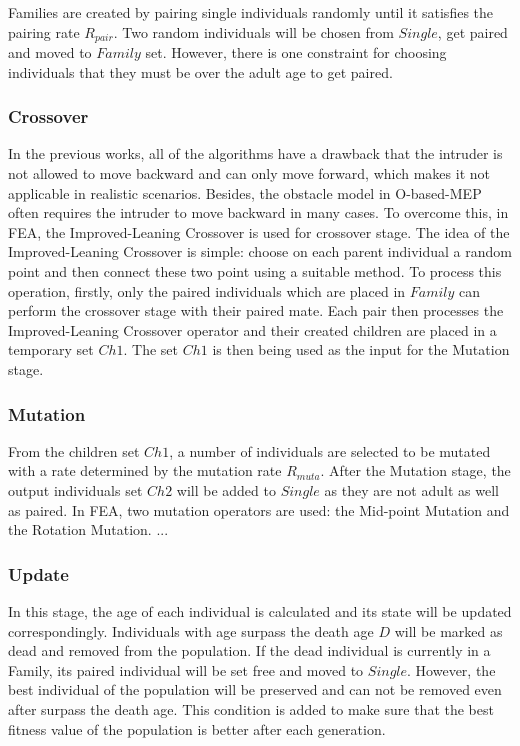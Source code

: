 \documentclass[final]{elsarticle}
\begin{document}
Families are created by pairing single individuals randomly until it satisfies the pairing rate $R_{pair}$. Two random individuals will be chosen from $Single$, get paired and moved to $Family$ set. However, there is one constraint for choosing individuals that they must be over the adult age to get paired.

\subsubsection{Crossover}

In the previous works, all of the algorithms have a drawback that the intruder is not allowed to move backward and can only move forward, which makes it not applicable in realistic scenarios. Besides, the obstacle model in O-based-MEP often requires the intruder to move backward in many cases. To overcome this, in FEA, the Improved-Leaning Crossover is used for crossover stage. The idea of the Improved-Leaning Crossover is simple: choose on each parent individual a random point and then connect these two point using a suitable method.
To process this operation, firstly, only the paired individuals which are placed in $Family$ can perform the crossover stage with their paired mate. Each pair then processes the Improved-Leaning Crossover operator and their created children are placed in a temporary set $Ch1$. The set $Ch1$ is then being used as the input for the Mutation stage.


\subsubsection{Mutation}

From the children set $Ch1$, a number of individuals are selected to be mutated with a rate determined by the mutation rate $R_{muta}$. After the Mutation stage, the output individuals set $Ch2$ will be added to $Single$ as they are not adult as well as paired. In FEA, two mutation operators are used: the Mid-point Mutation and the Rotation Mutation. ... 

\subsubsection{Update}

In this stage, the age of each individual is calculated and its state will be updated correspondingly. Individuals with age surpass the death age $D$ will be marked as dead and removed from the population. If the dead individual is currently in a Family, its paired individual will be set free and moved to $Single$. However, the best individual of the population will be preserved and can not be removed even after surpass the death age. This condition is added to make sure that the best fitness value of the population is better after each generation.
\end{document}
